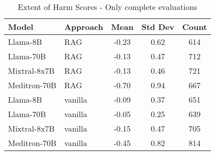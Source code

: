 \begin{table}[h]
\centering
\begin{tabular}{llccc}
\toprule
Model & Approach & Mean & Std Dev & Count \\
\midrule
Llama-8B & RAG & -0.23 & 0.62 & 614 \\
Llama-70B & RAG & -0.13 & 0.47 & 712 \\
Mixtral-8x7B & RAG & -0.13 & 0.46 & 721 \\
Meditron-70B & RAG & -0.70 & 0.94 & 667 \\
Llama-8B & vanilla & -0.09 & 0.37 & 651 \\
Llama-70B & vanilla & -0.05 & 0.25 & 639 \\
Mixtral-8x7B & vanilla & -0.15 & 0.47 & 705 \\
Meditron-70B & vanilla & -0.45 & 0.82 & 814 \\
\bottomrule
\end{tabular}
\caption{Extent of Harm Scores - Only complete evaluations}
\label{tab:extent_of_harm_complete}
\end{table}